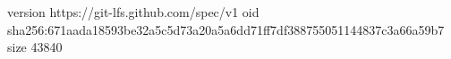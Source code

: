 version https://git-lfs.github.com/spec/v1
oid sha256:671aada18593be32a5c5d73a20a5a6dd71ff7df388755051144837c3a66a59b7
size 43840
